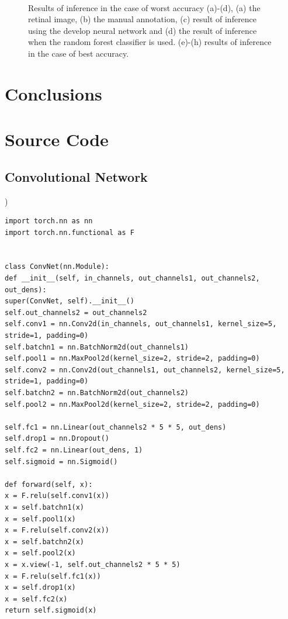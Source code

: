 \documentclass[aps,prb,10pt,twocolumn,groupedaddress]{revtex4-1}
\begin{document}
\begin{figure}[!t]
\begin{subfigure}[]{0.22\textwidth}
		\caption{}
	\end{subfigure}\\
	\caption{Results of inference in the case of worst accuracy (a)-(d), (a) the retinal image, (b) the manual annotation, (c) result of inference using the develop neural network and (d) the result of inference when the random forest classifier is used. (e)-(h) results of inference in the case of best accuracy.}
	\label{fig:result_images}
\end{figure}

\section{Conclusions}
\label{sec:conclusions}




\appendix
\onecolumngrid
\section{Source Code}
\label{appendix:a}
\lstset{language=Python}
\subsection{Convolutional Network})
\begin{lstlisting}
import torch.nn as nn
import torch.nn.functional as F


class ConvNet(nn.Module):
def __init__(self, in_channels, out_channels1, out_channels2, out_dens):
super(ConvNet, self).__init__()
self.out_channels2 = out_channels2
self.conv1 = nn.Conv2d(in_channels, out_channels1, kernel_size=5, stride=1, padding=0)
self.batchn1 = nn.BatchNorm2d(out_channels1)
self.pool1 = nn.MaxPool2d(kernel_size=2, stride=2, padding=0)
self.conv2 = nn.Conv2d(out_channels1, out_channels2, kernel_size=5, stride=1, padding=0)
self.batchn2 = nn.BatchNorm2d(out_channels2)
self.pool2 = nn.MaxPool2d(kernel_size=2, stride=2, padding=0)

self.fc1 = nn.Linear(out_channels2 * 5 * 5, out_dens)
self.drop1 = nn.Dropout()
self.fc2 = nn.Linear(out_dens, 1)
self.sigmoid = nn.Sigmoid()

def forward(self, x):
x = F.relu(self.conv1(x))
x = self.batchn1(x)
x = self.pool1(x)
x = F.relu(self.conv2(x))
x = self.batchn2(x)
x = self.pool2(x)
x = x.view(-1, self.out_channels2 * 5 * 5)
x = F.relu(self.fc1(x))
x = self.drop1(x)
x = self.fc2(x)
return self.sigmoid(x)
\end{lstlisting}
\end{document}
